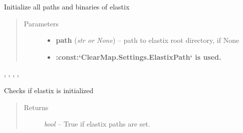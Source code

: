 \documentclass[letterpaper,10pt,english]{sphinxmanual}
\begin{document}

\begin{fulllineitems}
\label{api/ClearMap.Alignment:ClearMap.Alignment.Elastix.initializeElastix}
Initialize all paths and binaries of elastix
\begin{quote}\begin{description}
\item[{Parameters}] \leavevmode\begin{itemize}
\item {} 
\textbf{path} (\emph{str or None}) --
path to elastix root directory, if None

\item {} 
\textbf{:const:{}`ClearMap.Settings.ElastixPath{}` is used.}

\end{itemize}

\end{description}\end{quote}




{\hyperref[api/ClearMap.Alignment:ClearMap.Alignment.Elastix.ElastixBinary]{\emph{}}}, {\hyperref[api/ClearMap.Alignment:ClearMap.Alignment.Elastix.ElastixLib]{\emph{}}}, {\hyperref[api/ClearMap.Alignment:ClearMap.Alignment.Elastix.TransformixBinary]{\emph{}}},
{\hyperref[api/ClearMap.Alignment:ClearMap.Alignment.Elastix.Initialized]{\emph{}}}, {\hyperref[api/ClearMap.Alignment:ClearMap.Alignment.Elastix.setElastixLibraryPath]{\emph{}}}



\end{fulllineitems}


\begin{fulllineitems}
\label{api/ClearMap.Alignment:ClearMap.Alignment.Elastix.checkElastixInitialized}
Checks if elastix is initialized
\begin{quote}\begin{description}
\item[{Returns}] \leavevmode
\emph{bool} --
True if elastix paths are set.

\end{description}\end{quote}

\end{fulllineitems}
\end{document}
